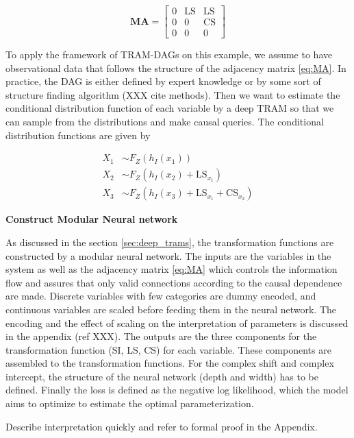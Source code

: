 \begin{equation}
\mathbf{MA} =
\begin{bmatrix}
  0 & \text{LS} & \text{LS} \\
  0 & 0  & \text{CS} \\
  0 & 0  & 0
\end{bmatrix}
\label{eq:MA}
\end{equation}

To apply the framework of TRAM-DAGs on this example, we assume to have observational data that follows the structure of the adjacency matrix \ref{eq:MA}. In practice, the DAG is either defined by expert knowledge or by some sort of structure finding algorithm (XXX cite methods). Then we want to estimate the conditional distribution function of each variable by a deep TRAM so that we can sample from the distributions and make causal queries. The conditional distribution functions are given by


\[
\begin{aligned}
X_1 &\sim F_Z(h_I(x_1)) \\
X_2 &\sim F_Z(h_I(x_2) + \mathrm{LS}_{x_1}) \\
X_3 &\sim F_Z(h_I(x_3) + \mathrm{LS}_{x_1} + \mathrm{CS}_{x_2})
\end{aligned}
\]


\textbf{Construct Modular Neural network}

As discussed in the section \ref{sec:deep_trams}, the transformation functions are constructed by a modular neural network. The inputs are the variables in the system as well as the adjacency matrix \ref{eq:MA} which controls the information flow and assures that only valid connections according to the causal dependence are made. Discrete variables with few categories are dummy encoded, and continuous variables are scaled before feeding them in the neural network. The encoding and the effect of scaling on the interpretation of parameters is discussed in the appendix (ref XXX). The outputs are the three components for the transformation function (SI, LS, CS) for each variable. These components are assembled to the transformation functions. For the complex shift and complex intercept, the structure of the neural network (depth and width) has to be defined. 
Finally the loss is defined as the negative log likelihood, which the model aims to optimize to estimate the optimal parameterization. 


Describe interpretation quickly and refer to formal proof in the Appendix.

